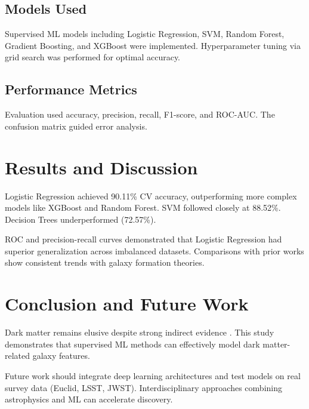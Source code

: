 \documentclass[12pt,a4paper]{report}
\begin{document}
\section{Models Used}
Supervised ML models including Logistic Regression, SVM, Random Forest, Gradient Boosting, and XGBoost were implemented. Hyperparameter tuning via grid search was performed for optimal accuracy. 

\section{Performance Metrics}
Evaluation used accuracy, precision, recall, F1-score, and ROC-AUC. The confusion matrix guided error analysis. 

\chapter{Results and Discussion}
Logistic Regression achieved 90.11\% CV accuracy, outperforming more complex models like XGBoost and Random Forest. SVM followed closely at 88.52\%. Decision Trees underperformed (72.57\%).  

ROC and precision-recall curves demonstrated that Logistic Regression had superior generalization across imbalanced datasets. Comparisons with prior works \cite{brook2012,kroupa2001} show consistent trends with galaxy formation theories. 

\chapter{Conclusion and Future Work}
Dark matter remains elusive despite strong indirect evidence \cite{clowe2006,planck2016}. This study demonstrates that supervised ML methods can effectively model dark matter-related galaxy features.  

Future work should integrate deep learning architectures and test models on real survey data (Euclid, LSST, JWST). Interdisciplinary approaches combining astrophysics and ML can accelerate discovery. 



\end{document}

